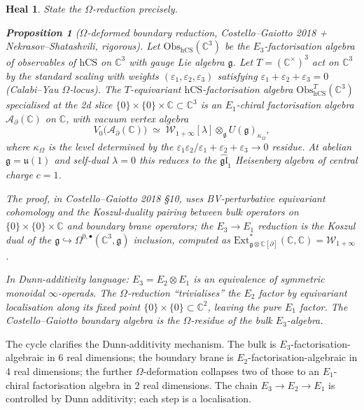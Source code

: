 \documentclass[11pt]{article}
\newtheorem{proposition}[theorem]{Proposition}
\newtheorem*{heal}{Heal}
\providecommand{\Eone}{E_1}
\providecommand{\Etwo}{E_2}
\providecommand{\Ethree}{E_3}
\providecommand{\C}{\mathbb{C}}
\providecommand{\cA}{\mathcal{A}}
\providecommand{\cW}{\mathcal{W}}
\providecommand{\fg}{\mathfrak{g}}
\providecommand{\fgl}{\mathfrak{gl}}
\providecommand{\fu}{\mathfrak{u}}
\providecommand{\hCS}{\mathrm{hCS}}
\providecommand{\Obs}{\mathrm{Obs}}
\begin{document}
\begin{heal}
State the $\Omega$-reduction precisely.
\begin{proposition}[$\Omega$-deformed boundary reduction, Costello--Gaiotto
2018 + Nekrasov--Shatashvili, rigorous]
\label{prop:omega-reduction}
Let $\Obs_{\hCS}(\C^3)$ be the $\Ethree$-factorisation algebra of
observables of $\hCS$ on $\C^3$ with gauge Lie algebra $\fg$. Let
$T = (\C^\times)^3$ act on $\C^3$ by the standard scaling with weights
$(\varepsilon_1,\varepsilon_2,\varepsilon_3)$ satisfying
$\varepsilon_1+\varepsilon_2+\varepsilon_3 = 0$ (Calabi--Yau $\Omega$-locus).
The $T$-equivariant $\hCS$-factorisation algebra
$\Obs^T_{\hCS}(\C^3)$ specialised at the 2d slice
$\{0\}\times\{0\}\times\C\subset\C^3$ is an $\Eone$-chiral factorisation
algebra $\cA_\partial(\C)$ on $\C$, with vacuum vertex algebra
\[
  V_0\bigl(\cA_\partial(\C)\bigr)
  \;\simeq\;
  \cW_{1+\infty}[\lambda]\!\otimes_{\fg} U(\fg)_{\kappa_{\Omega}},
\]
where $\kappa_\Omega$ is the level determined by the
$\varepsilon_1\varepsilon_2/\varepsilon_1+\varepsilon_2+\varepsilon_3\to 0$
residue. At abelian $\fg = \fu(1)$ and self-dual $\lambda = 0$ this
reduces to the $\widehat{\fgl}_1$ Heisenberg algebra of central charge
$c = 1$.
\end{proposition}

The proof, in Costello--Gaiotto 2018 \S10, uses BV-perturbative
equivariant cohomology and the Koszul-duality pairing between bulk
operators on $\{0\}\times\{0\}\times\C$ and boundary brane operators;
the $\Ethree \to \Eone$ reduction is the Koszul dual of the
$\fg \hookrightarrow \Omega^{0,\bullet}(\C^3,\fg)$ inclusion, computed
as $\mathrm{Ext}^*_{\fg\otimes\C[\partial]}(\C, \C) = \cW_{1+\infty}$.

In Dunn-additivity language: $\Ethree = \Etwo \otimes \Eone$ is an
equivalence of symmetric monoidal $\infty$-operads. The $\Omega$-reduction
``trivialises'' the $\Etwo$ factor by equivariant localisation along
its fixed point $\{0\}\times\{0\}\subset\C^2$, leaving the pure $\Eone$
factor. The Costello--Gaiotto boundary algebra is the $\Omega$-residue
of the bulk $\Ethree$-algebra.
\end{heal}

The cycle clarifies the Dunn-additivity mechanism. The bulk is
$\Ethree$-factorisation-algebraic in 6 real dimensions; the boundary
brane is $\Etwo$-factorisation-algebraic in 4 real dimensions; the
further $\Omega$-deformation collapses two of those to an $\Eone$-chiral
factorisation algebra in 2 real dimensions. The chain $\Ethree \to \Etwo
\to \Eone$ is controlled by Dunn additivity; each step is a localisation.
\end{document}
